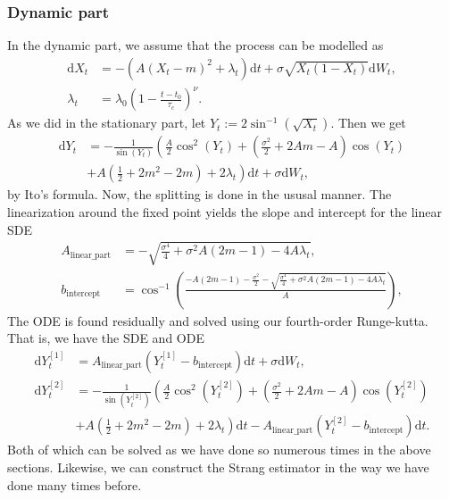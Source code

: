 \subsubsection{Dynamic part}
In the dynamic part, we assume that the process can be modelled as
\begin{align}
    \mathrm{d}X_t &= -\left(A(X_t - m)^2 + \lambda_t\right)\mathrm{d}t + \sigma \sqrt{X_t\left(1 - X_t\right)}\mathrm{d}W_t,\\
    \lambda_t &= \lambda_0 \left(1 - \frac{t - t_0}{\tau_c}\right)^\nu.
\end{align}
As we did in the stationary part, let $Y_t := 2 \sin^{-1}\left(\sqrt{X_t}\right)$. Then we get 
\begin{align}
    \mathrm{d}Y_t &= - \frac{1}{\sin(Y_t)}\left(\frac{A}{2}\cos^2(Y_t) + \left(\frac{\sigma^2}{2} + 2 Am - A\right)\cos(Y_t) \right. \nonumber \\
    &+ \left. A \left(\frac{1}{2} + 2m^2 - 2m\right) + 2\lambda_t\right)\mathrm{d}t + \sigma \mathrm{d}W_t, \label{eq:JacobiLampertiDynamicSDE}
\end{align}
by Ito's formula. Now, the splitting is done in the ususal manner. The linearization around the fixed point yields the slope and intercept for the linear SDE
\begin{align}
    A_{\mathrm{linear\_part}} &= -\sqrt{\frac{\sigma^4}{4} + \sigma^2A\left(2m - 1\right) - 4A\lambda_t},\\
    b_{\mathrm{intercept}} &= \cos^{-1}\left(\frac{-A\left(2m - 1\right) - \frac{\sigma^2}{2} - \sqrt{\frac{\sigma^4}{4} + \sigma^2A\left(2m - 1\right) - 4A\lambda_t}}{A}\right),
\end{align}
The ODE is found residually and solved using our fourth-order Runge-kutta. That is, we have the SDE and ODE
\begin{align}
    \mathrm{d}Y_t^{[1]} &= A_{\mathrm{linear\_part}}\left(Y_t^{[1]} -  b_{\mathrm{intercept}}\right)\mathrm{d}t + \sigma \mathrm{d}W_t,\\
    \mathrm{d}Y_t^{[2]} &=- \frac{1}{\sin(Y_t^{[2]})}\left(\frac{A}{2}\cos^2(Y_t^{[2]}) + \left(\frac{\sigma^2}{2} + 2 Am - A\right)\cos(Y_t^{[2]}) \right. \nonumber \\
    &+ \left. A \left(\frac{1}{2} + 2m^2 - 2m\right) + 2\lambda_t\right) \mathrm{d}t - A_{\mathrm{linear\_part}}\left(Y_t^{[2]} -  b_{\mathrm{intercept}}\right)\mathrm{d}t  \label{eq:dynamicjacobiODE}.
\end{align}
Both of which can be solved as we have done so numerous times in the above sections. Likewise, we can construct the Strang estimator in the way we have done many times before.
\newpage
